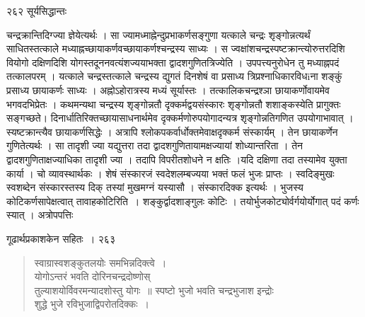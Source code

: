 \documentclass[11pt, openany]{book}
\begin{document}
\newpage


\noindent २६२ \hspace{4cm} सूर्यसिद्धान्तः
\vspace{1cm}


\noindent चन्द्रक्रान्तिदिग्ज्या ज्ञेयेत्यर्थः । सा ज्यामध्माह्नेन्दुप्रभाकर्णसङ्गुणा यत्काले चन्द्रः शृङ्गोन्नत्यर्थं साधितस्तत्काले मध्याह्नच्छायाकर्णवच्छायाकर्णश्चन्द्रस्य साध्यः । स ज्वक्षांशचन्द्रस्पष्टक्रान्त्योरुत्तरदिशि वियोगो दक्षिणदिशि योगस्तदूननवत्यंशज्ययाभक्ता द्वादशगुणितत्रिज्येति । उपपत्त्यनुरोधेन तु मध्याह्नपदं तत्कालपरम् । यत्काले चन्द्रस्तत्काले चन्द्रस्य द्युगतं दिनशेषं वा प्रसाध्य त्रिप्रश्नाधिकारविधiना शङ्कुं प्रसाध्य छायाकर्णः साध्यः । अह्नोऽहोरात्रस्य मध्यं सूर्यास्तः । तत्कालिकचन्द्रश्ञा छायाकर्णोवायमेव भगवदभिप्रेतः । कथमन्यथा चन्द्रस्य शृङ्गोन्नतौ दृक्कर्मद्वयसंस्कारः शृङ्गोन्नतौ शशाङ्कस्येति प्रागुक्तः सङ्गच्छते। दिनार्धातिरिक्तच्छायासाधनार्थमेव दृक्कर्मणोरुपयोगादन्यत्र शृङ्गोन्नतिगणित उपयोगाभावात् । स्यष्टक्रान्त्यैव छायाकर्णसिद्धेः । अत्रापि श्लोकपकर्वार्धोक्तमेवाक्षदृक्कर्म संस्कार्यम् । तेन छायाकर्णेन गुणितेत्यर्थः । सा तादृशी ज्या यद्युत्तरा तदा द्वादशगुणितायामक्षज्यायां शोध्यान्तरिता । तेन द्वादशगुणिताक्षज्याधिका तादृशी ज्या । तदापि विपरीतशोधने न क्षतिः ।यदि दक्षिणा तदा तस्यामेव युक्ता कार्या । चो व्यावस्थार्थकः । शेषं संस्कारजं स्वदेशलम्बज्यया भक्तं फलं भुजः प्राप्तः । स्वदिङ्मुखः स्वशब्देन संस्कारस्तस्य दिक् तस्यां मुखमग्नं यस्यासौ । संस्कारदिक्क इत्यर्थः । भुजस्य कोटिकर्णसापेक्षत्वात् तावाह\textendash कोटिरिति~। शङ्कुर्द्वादशाङ्गुलः कोटिः । तयोर्भुजकोट्योर्वर्गयोर्योगात् पदं कर्णः स्यात् । अत्रोपपत्तिः\textendash


\newpage


\hspace{3cm} गूढार्थप्रकाशकेन सहितः~। \hfill २६३ 
\vspace{1cm}


 \begin{quote}
{\qt स्वाग्रास्वशङ्कुतलयोः समभिन्नदिक्त्वे~।\\
योगोऽन्तरं भवति दोरिनचन्द्रदोष्णोस् \\
तुल्याशयोर्विवरमन्यादशोस्तु योगः~॥
स्पष्टो भुजो भवति चन्द्रभुजाश इन्द्रोः \\
शुद्धे भुजे रविभुजाद्विपरोतदिक्कः~। }
\end{quote}
\end{document}
